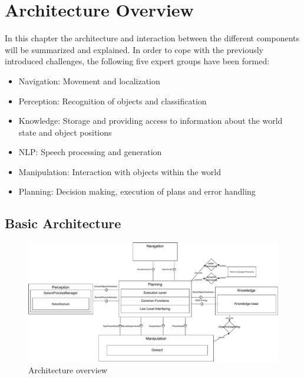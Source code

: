 \documentclass[main.tex]{subfiles}
\begin{document}
	\begingroup

	\renewcommand{\cleardoublepage}{}

	\renewcommand{\clearpage}{}

	\chapter{Architecture Overview}
		In this chapter the architecture and interaction between the different components will be summarized and explained.
		In order to cope with the previously introduced challenges, the following five expert groups have been formed:

		\begin{itemize}
			\item Navigation: Movement and localization
			\item Perception: Recognition of objects and classification
			\item Knowledge: Storage and providing access to information about the world state and object positions
			\item NLP: Speech processing and generation
			\item Manipulation: Interaction with objects within the world
			\item Planning: Decision making, execution of plans and error handling
		\end{itemize}
		
		\section{Basic Architecture}
		
		\begin{figure}[h]
			\centering
			\includegraphics[width=1.1\textwidth]{pictures/diagramms/overview.pdf}
			\caption{Architecture overview}
			\label{architecture}
		\end{figure}
		
\end{document}
